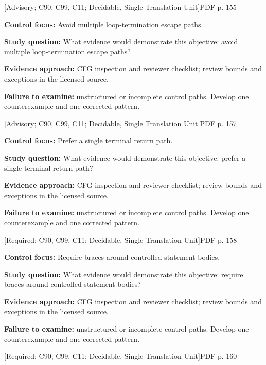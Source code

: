 \documentclass[10pt,letterpaper]{article}
\begin{document}
\smallskip
{}
 \textsf{\footnotesize [Advisory; C90, C99, C11; Decidable, Single Translation Unit]}\hfill{\footnotesize PDF p. 155}\par
\textbf{Control focus:} Avoid multiple loop-termination escape paths.\par
\textbf{Study question:} What evidence would demonstrate this objective: avoid multiple loop-termination escape paths?\par
\textbf{Evidence approach:} CFG inspection and reviewer checklist; review bounds and exceptions in the licensed source.\par
\textbf{Failure to examine:} unstructured or incomplete control paths. Develop one counterexample and one corrected pattern.\par
\smallskip
{}
 \textsf{\footnotesize [Advisory; C90, C99, C11; Decidable, Single Translation Unit]}\hfill{\footnotesize PDF p. 157}\par
\textbf{Control focus:} Prefer a single terminal return path.\par
\textbf{Study question:} What evidence would demonstrate this objective: prefer a single terminal return path?\par
\textbf{Evidence approach:} CFG inspection and reviewer checklist; review bounds and exceptions in the licensed source.\par
\textbf{Failure to examine:} unstructured or incomplete control paths. Develop one counterexample and one corrected pattern.\par
\smallskip
{}
 \textsf{\footnotesize [Required; C90, C99, C11; Decidable, Single Translation Unit]}\hfill{\footnotesize PDF p. 158}\par
\textbf{Control focus:} Require braces around controlled statement bodies.\par
\textbf{Study question:} What evidence would demonstrate this objective: require braces around controlled statement bodies?\par
\textbf{Evidence approach:} CFG inspection and reviewer checklist; review bounds and exceptions in the licensed source.\par
\textbf{Failure to examine:} unstructured or incomplete control paths. Develop one counterexample and one corrected pattern.\par
\smallskip
{}
 \textsf{\footnotesize [Required; C90, C99, C11; Decidable, Single Translation Unit]}\hfill{\footnotesize PDF p. 160}\par
\end{document}
